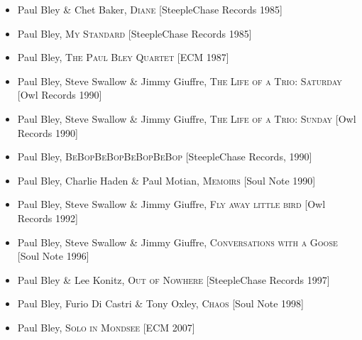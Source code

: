 \begin{itemize}
	\item Paul Bley \& Chet Baker, \textsc{Diane} [SteepleChase Records 1985]
	\item Paul Bley, \textsc{My Standard} [SteepleChase Records 1985]
	\item Paul Bley, \textsc{The Paul Bley Quartet} [ECM 1987]
	\item Paul Bley, Steve Swallow \& Jimmy
	 Giuffre, \textsc{The Life of a Trio: Saturday} [Owl Records 1990]
	\item Paul Bley, Steve Swallow \& Jimmy Giuffre, \textsc{The Life of a Trio: Sunday} [Owl Records 1990]
	\item Paul Bley, \textsc{BeBopBeBopBeBopBeBop} [SteepleChase Records, 1990]
	\item Paul Bley, Charlie Haden \& Paul Motian, \textsc{Memoirs} [Soul Note 1990]
	\item Paul Bley, Steve Swallow \& Jimmy Giuffre, \textsc{Fly away little bird} [Owl Records 1992]
	\item Paul Bley, Steve Swallow \& Jimmy Giuffre, \textsc{Conversations with a Goose} [Soul Note 1996]
	\item Paul Bley \& Lee Konitz, \textsc{Out of Nowhere} [SteepleChase Records 1997]
	\item Paul Bley, Furio Di Castri \& Tony Oxley, \textsc{Chaos} [Soul Note 1998]
	\item Paul Bley, \textsc{Solo in Mondsee} [ECM 2007]
\end{itemize}
\nocite{carlasite}